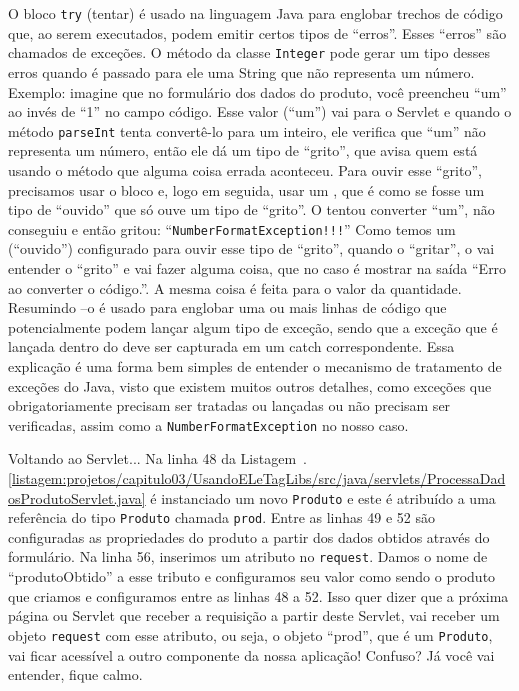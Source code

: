 O bloco \texttt{try} (tentar) é usado na linguagem Java para englobar trechos de código que, ao serem executados, podem emitir certos tipos de ``erros''. Esses ``erros'' são chamados de exceções. O método  da classe \texttt{Integer} pode gerar um tipo desses erros quando é passado para ele uma String que não representa um número. Exemplo: imagine que no formulário dos dados do produto, você preencheu ``um'' ao invés de ``1'' no campo código. Esse valor (``um'') vai para o Servlet e quando o método \texttt{parseInt} tenta convertê-lo para um inteiro, ele verifica que ``um'' não representa um número, então ele dá um tipo de ``grito'', que avisa quem está usando o método que alguma coisa errada aconteceu. Para ouvir esse ``grito'', precisamos usar o bloco  e, logo em seguida, usar um , que é como se fosse um tipo de ``ouvido'' que só ouve um tipo de ``grito''. O  tentou converter ``um'', não conseguiu e então gritou: ``\texttt{NumberFormatException!!!}'' Como temos um  (``ouvido'') configurado para ouvir esse tipo de ``grito'', quando o  ``gritar'', o  vai entender o ``grito'' e vai fazer alguma coisa, que no caso é mostrar na saída ``Erro ao converter o código.''. A mesma coisa é feita para o valor da quantidade. Resumindo –o  é usado para englobar uma ou mais linhas de código que potencialmente podem lançar algum tipo de exceção, sendo que a exceção que é lançada dentro do  deve ser capturada em um catch correspondente. Essa explicação é uma forma bem simples de entender o mecanismo de tratamento de exceções do Java, visto que existem muitos outros detalhes, como exceções que obrigatoriamente precisam ser tratadas ou lançadas ou não precisam ser verificadas, assim como a \texttt{NumberFormatException} no nosso caso.

Voltando ao Servlet... Na linha 48 da Listagem~\thechapter.\ref{listagem:projetos/capitulo03/UsandoELeTagLibs/src/java/servlets/ProcessaDadosProdutoServlet.java} é instanciado um novo \texttt{Produto} e este é atribuído a uma referência do tipo \texttt{Produto} chamada \texttt{prod}. Entre as linhas 49 e 52 são configuradas as propriedades do produto a partir dos dados obtidos através do formulário. Na linha 56, inserimos um atributo no \texttt{request}. Damos o nome de ``produtoObtido'' a esse tributo e configuramos seu valor como sendo o produto que criamos e configuramos entre as linhas 48 a 52. Isso quer dizer que a próxima página ou Servlet que receber a requisição a partir deste Servlet, vai receber um objeto \texttt{request} com esse atributo, ou seja, o objeto ``prod'', que é um \texttt{Produto}, vai ficar acessível a outro componente da nossa aplicação! Confuso? Já você vai entender, fique calmo.

